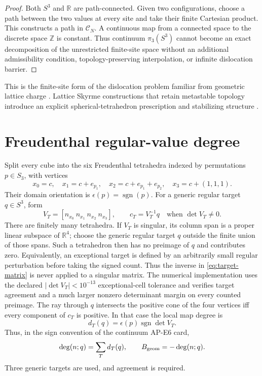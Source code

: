 \documentclass[11pt]{article}
\theoremstyle{definition}
\theoremstyle{remark}
\newcommand{\RR}{\mathbb R}
\newcommand{\sgn}{\operatorname{sgn}}
\newcommand{\cC}{\mathcal C}
\begin{document}
\begin{proof}
Both $S^3$ and $\RR$ are path-connected. Given two configurations, choose a
path between the two values at every site and take their finite Cartesian
product. This constructs a path in $\cC_N$. A continuous map from a connected
space to the discrete space $\mathbb Z$ is constant. Thus continuum
$\pi_3(S^3)$ cannot become an exact decomposition of the unrestricted
finite-site space without an additional admissibility condition,
topology-preserving interpolation, or infinite dislocation barrier.
\end{proof}

This is the finite-site form of the dislocation problem familiar from
geometric lattice charge \cite{BergLuscher1981APE7,Berg1981DislocationsAPE7}.
Lattice Skyrme constructions that retain metastable topology introduce an
explicit spherical-tetrahedron prescription and stabilizing structure
\cite{SchrammSvetitsky2000APE7}.

\section{Freudenthal regular-value degree}

Split every cube into the six Freudenthal tetrahedra indexed by permutations
$p\in S_3$, with vertices
\begin{equation}
 x_0=c,\quad x_1=c+e_{p_1},\quad
 x_2=c+e_{p_1}+e_{p_2},\quad x_3=c+(1,1,1).
\end{equation}
Their domain orientation is $\epsilon(p)=\sgn(p)$. For a generic regular
target $q\in S^3$, form
\begin{equation}
 V_T=[n_{x_0}\ n_{x_1}\ n_{x_2}\ n_{x_3}],\qquad
 c_T=V_T^{-1}q\quad\text{when }\det V_T\ne0.
 \label{eq:target-matrix}
\end{equation}
There are finitely many tetrahedra.  If $V_T$ is singular, its column span is
a proper linear subspace of $\mathbb R^4$; choose the generic regular target
$q$ outside the finite union of those spans.  Such a tetrahedron then has no
preimage of $q$ and contributes zero.  Equivalently, an exceptional target is
defined by an arbitrarily small regular perturbation before taking the signed
count.  Thus the inverse in \eqref{eq:target-matrix} is never applied to a
singular matrix.  The numerical implementation uses the declared
$|\det V_T|<10^{-13}$ exceptional-cell tolerance and verifies target agreement
and a much larger nonzero determinant margin on every counted preimage.
The ray through $q$ intersects the positive cone of the four vertices iff
every component of $c_T$ is positive. In that case the local map degree is
\begin{equation}
 d_T(q)=\epsilon(p)\sgn\det V_T.
\end{equation}
Thus, in the sign convention of the continuum AP-E6 card,
\begin{equation}
 \deg(n;q)=\sum_T d_T(q),\qquad B_{\rm geom}=-\deg(n;q).
 \label{eq:degree}
\end{equation}
Three generic targets are used, and agreement is required.
\end{document}
